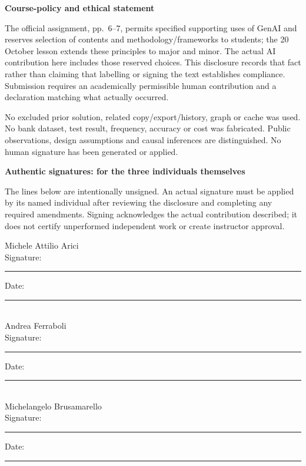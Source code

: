 \documentclass[11pt,a4paper]{article}
\newcommand{\sub}[1]{\par\vspace{2mm}\textbf{\color{ink}#1}\par}
\begin{document}
\sub{Course-policy and ethical statement}
The official assignment, pp.~6--7, permits specified supporting uses of GenAI and reserves selection of contents and methodology/frameworks to students; the 20 October lesson extends these principles to major and minor. The actual AI contribution here includes those reserved choices. This disclosure records that fact rather than claiming that labelling or signing the text establishes compliance. Submission requires an academically permissible human contribution and a declaration matching what actually occurred.

No excluded prior solution, related copy/export/history, graph or cache was used. No bank dataset, test result, frequency, accuracy or cost was fabricated. Public observations, design assumptions and causal inferences are distinguished. No human signature has been generated or applied.

\sub{Authentic signatures: for the three individuals themselves}
The lines below are intentionally unsigned. An actual signature must be applied by its named individual after reviewing the disclosure and completing any required amendments. Signing acknowledges the actual contribution described; it does not certify unperformed independent work or create instructor approval.

Michele Attilio Arici\\[3mm]
Signature: \rule{72mm}{0.4pt}\quad Date: \rule{29mm}{0.4pt}\\[6mm]
Andrea Ferraboli\\[3mm]
Signature: \rule{72mm}{0.4pt}\quad Date: \rule{29mm}{0.4pt}\\[6mm]
Michelangelo Brusamarello\\[3mm]
Signature: \rule{72mm}{0.4pt}\quad Date: \rule{29mm}{0.4pt}
\end{document}
